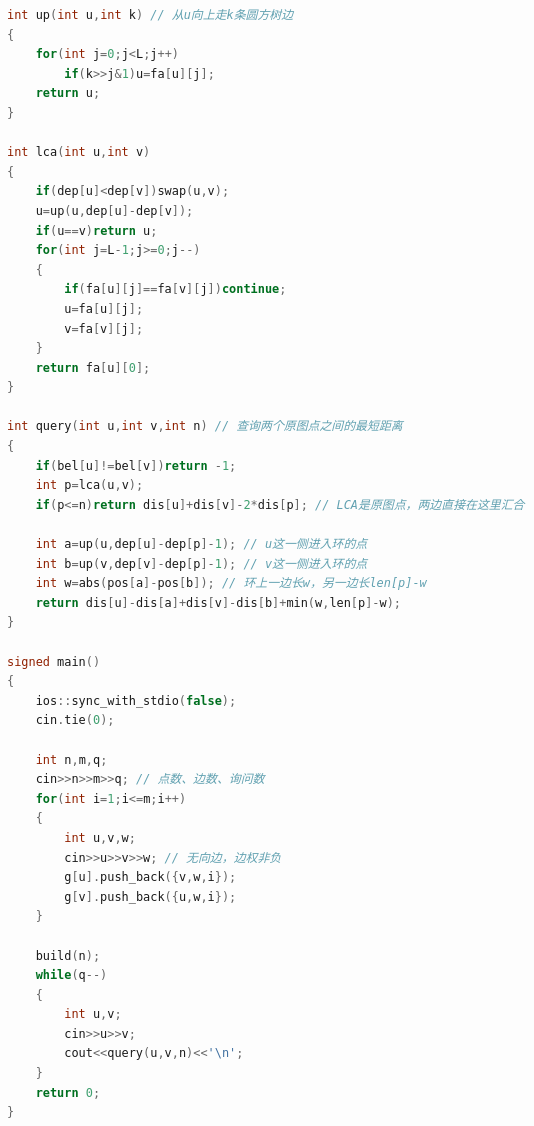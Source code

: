 \documentclass[10pt,landscape,a4paper]{article}
\begin{document}
\begin{multicols*}{3}
\begin{lstlisting}[language=C++]
int up(int u,int k) // 从u向上走k条圆方树边
{
    for(int j=0;j<L;j++)
        if(k>>j&1)u=fa[u][j];
    return u;
}

int lca(int u,int v)
{
    if(dep[u]<dep[v])swap(u,v);
    u=up(u,dep[u]-dep[v]);
    if(u==v)return u;
    for(int j=L-1;j>=0;j--)
    {
        if(fa[u][j]==fa[v][j])continue;
        u=fa[u][j];
        v=fa[v][j];
    }
    return fa[u][0];
}

int query(int u,int v,int n) // 查询两个原图点之间的最短距离
{
    if(bel[u]!=bel[v])return -1;
    int p=lca(u,v);
    if(p<=n)return dis[u]+dis[v]-2*dis[p]; // LCA是原图点，两边直接在这里汇合

    int a=up(u,dep[u]-dep[p]-1); // u这一侧进入环的点
    int b=up(v,dep[v]-dep[p]-1); // v这一侧进入环的点
    int w=abs(pos[a]-pos[b]); // 环上一边长w，另一边长len[p]-w
    return dis[u]-dis[a]+dis[v]-dis[b]+min(w,len[p]-w);
}

signed main()
{
    ios::sync_with_stdio(false);
    cin.tie(0);

    int n,m,q;
    cin>>n>>m>>q; // 点数、边数、询问数
    for(int i=1;i<=m;i++)
    {
        int u,v,w;
        cin>>u>>v>>w; // 无向边，边权非负
        g[u].push_back({v,w,i});
        g[v].push_back({u,w,i});
    }

    build(n);
    while(q--)
    {
        int u,v;
        cin>>u>>v;
        cout<<query(u,v,n)<<'\n';
    }
    return 0;
}
\end{lstlisting}

\end{multicols*}
\end{document}
